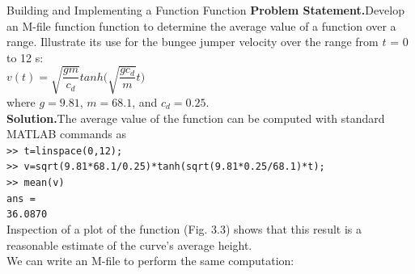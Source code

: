 \documentclass[../main.tex]{subfiles}
\begin{document}
\begin{example} Building and Implementing a Function Function
    \noindent\textbf{Problem Statement.}\quad Develop an M-file function function to determine the average value
    of a function over a range. Illustrate its use for the bungee jumper velocity over the range
    from $t$ = 0 to 12 s:\\

    $v(t) = \sqrt{\dfrac{gm}{c_d}}tanh\Big(\sqrt{\dfrac{gc_d}{m}}t \Big)$\\

    \noindent where $g = 9.81$, $m = 68.1$, and $c_d = 0.25$.\\

    \noindent\textbf{Solution.}\quad The average value of the function can be computed with standard MATLAB
    commands as\\

    \texttt{>> t=linspace(0,12);\\
    \indent >> v=sqrt(9.81*68.1/0.25)*tanh(sqrt(9.81*0.25/68.1)*t);\\
    \indent >> mean(v)\\
    \indent ans =\\
    \indent\hspace{2mm} 36.0870}\\

    \noindent
    Inspection of a plot of the function (Fig. 3.3) shows that this result is a reasonable estimate
    of the curve's average height.\\

    We can write an M-file to perform the same computation:\\


\end{example}
\end{document}

